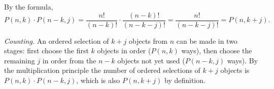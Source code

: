 By the formula,
\[P(n,k)\cdot P(n-k,j)=\dfrac{n!}{(n-k)!}\cdot\dfrac{(n-k)!}{(n-k-j)!}=\dfrac{n!}{(n-k-j)!}=\boxed{P(n,k+j)}.\]

\emph{Counting.} An ordered selection of $k+j$ objects from $n$ can be made in two stages: first choose the first $k$ objects in order ($P(n,k)$ ways), then choose the remaining $j$ in order from the $n-k$ objects not yet used ($P(n-k,j)$ ways). By the multiplication principle the number of ordered selections of $k+j$ objects is $P(n,k)\cdot P(n-k,j)$, which is also $P(n,k+j)$ by definition.
